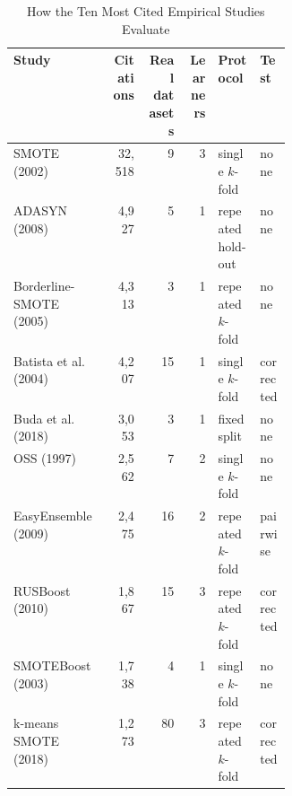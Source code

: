 \begin{table}[t]
  \caption{How the Ten Most Cited Empirical Studies Evaluate}
  \label{tab:empirical-topcited}
  \footnotesize
  \setlength{\tabcolsep}{4pt}
  \begin{tabular}{@{}>{\raggedright\arraybackslash}p{0.36\linewidth}rrrll@{}}
    \toprule
    Study & Citations & Real datasets & Learners & Protocol & Test\\
    \midrule
    SMOTE (2002)~\parencite{chawla2002smote} & 32{,}518 & 9 & 3 & single $k$-fold & none\\
    ADASYN (2008)~\parencite{he2008adasyn} & 4{,}927 & 5 & 1 & repeated hold-out & none\\
    Borderline-SMOTE (2005)~\parencite{han2005borderline} & 4{,}313 & 3 & 1 & repeated $k$-fold & none\\
    Batista et al. (2004)~\parencite{batista2004study} & 4{,}207 & 15 & 1 & single $k$-fold & corrected\\
    Buda et al. (2018)~\parencite{buda2018systematic} & 3{,}053 & 3 & 1 & fixed split & none\\
    OSS (1997)~\parencite{kubat1997oss} & 2{,}562 & 7 & 2 & single $k$-fold & none\\
    EasyEnsemble (2009)~\parencite{liu2009easyensemble} & 2{,}475 & 16 & 2 & repeated $k$-fold & pairwise\\
    RUSBoost (2010)~\parencite{seiffert2010rusboost} & 1{,}867 & 15 & 3 & repeated $k$-fold & corrected\\
    SMOTEBoost (2003)~\parencite{chawla2003smoteboost} & 1{,}738 & 4 & 1 & single $k$-fold & none\\
    k-means SMOTE (2018)~\parencite{douzas2018kmeans} & 1{,}273 & 80 & 3 & repeated $k$-fold & corrected\\
    \bottomrule
  \end{tabular}
\end{table}
